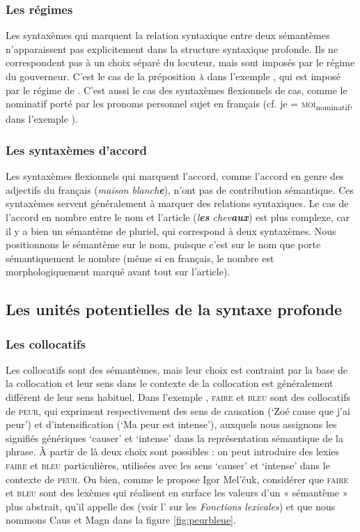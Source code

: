 \subsubsection{Les régimes}
Les syntaxèmes qui marquent la relation syntaxique entre deux sémantèmes n’apparaissent pas explicitement dans la structure syntaxique profonde. Ils ne correspondent pas à un choix séparé du locuteur, mais sont imposés par le régime du gouverneur. C’est le cas de la préposition \textsc{à} dans l’exemple , qui est imposé par le régime de . C’est aussi le cas des syntaxèmes flexionnels de cas, comme le nominatif porté par les pronoms personnel sujet en français (cf. je = \textsc{moi}\textsubscript{nominatif}, dans l’exemple ).

\subsubsection{Les syntaxèmes d’accord} 
Les syntaxèmes flexionnels qui marquent l’accord, comme l’accord en genre des adjectifs du français (\textit{maison blanch\textbf{e}}), n’ont pas de contribution sémantique. Ces syntaxèmes servent généralement à marquer des relations syntaxiques. Le cas de l’accord en nombre entre le nom et l’article (\textit{l\textbf{es} chev\textbf{aux}}) est plus complexe, car il y a bien un sémantème de pluriel, qui correspond à deux syntaxèmes. Nous positionnons le sémantème sur le nom, puisque c’est sur le nom que porte sémantiquement le nombre (même si en français, le nombre est morphologiquement marqué avant tout sur l’article).

\subsection{Les unités potentielles de la syntaxe profonde}\label{sec:13-potentiel}

\subsubsection{Les collocatifs}
Les collocatifs sont des sémantèmes, mais leur choix est contraint par la base de la collocation et leur sens dans le contexte de la collocation est généralement différent de leur sens habituel. Dans l’exemple , \textsc{faire} et \textsc{bleu} sont des collocatifs de \textsc{peur}, qui expriment respectivement des sens de causation (‘Zoé cause que j’ai peur’) et d’intensification (‘Ma peur est intense’), auxquels nous assignons les signifiés génériques ‘causer’ et ‘intense’ dans la représentation sémantique de la phrase. À partir de là deux choix sont possibles : on peut introduire des lexies \textsc{faire} et \textsc{bleu} particulières, utilisées avec les sens ‘causer’ et ‘intense’ dans le contexte de \textsc{peur}. Ou bien, comme le propose Igor Mel’čuk, considérer que \textsc{faire} et \textsc{bleu} sont des lexèmes qui réalisent en surface les valeurs d’un « sémantème » plus abstrait, qu’il appelle des  (voir l' sur les \textit{Fonctions lexicales}) et que nous nommons Caus et Magn dans la figure \ref{fig:peurbleue}.

